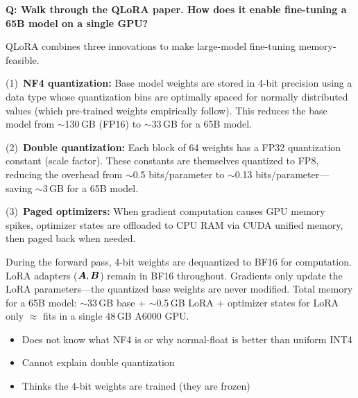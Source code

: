 \begin{interviewq}
\end{interviewq}

\bigskip

\begin{interviewq}
\textbf{Q: Walk through the QLoRA paper. How does it enable fine-tuning a 65B
model on a single GPU?}

 \quad {} \quad \badgefreq{\freqmed}

\stronganswer
QLoRA combines three innovations to make large-model fine-tuning memory-feasible.

(1)~\textbf{NF4 quantization:} Base model weights are stored in 4-bit precision
using a data type whose quantization bins are optimally spaced for normally
distributed values (which pre-trained weights empirically follow).  This reduces
the base model from $\sim$130\,GB (FP16) to $\sim$33\,GB for a 65B model.

(2)~\textbf{Double quantization:} Each block of 64 weights has a FP32 quantization
constant (scale factor).  These constants are themselves quantized to FP8, reducing
the overhead from $\sim$0.5 bits/parameter to $\sim$0.13 bits/parameter---saving
$\sim$3\,GB for a 65B model.

(3)~\textbf{Paged optimizers:} When gradient computation causes GPU memory spikes,
optimizer states are offloaded to CPU RAM via CUDA unified memory, then paged back
when needed.

During the forward pass, 4-bit weights are dequantized to BF16 for computation.
LoRA adapters ($\bm{A}, \bm{B}$) remain in BF16 throughout.  Gradients only update the
LoRA parameters---the quantized base weights are never modified.  Total memory
for a 65B model: $\sim$33\,GB base + $\sim$0.5\,GB LoRA + optimizer states for
LoRA only $\approx$ fits in a single 48\,GB A6000 GPU.

\redflags
\begin{itemize}
    \item Does not know what NF4 is or why normal-float is better than uniform INT4
    \item Cannot explain double quantization
    \item Thinks the 4-bit weights are trained (they are frozen)
\end{itemize}



\end{interviewq}
